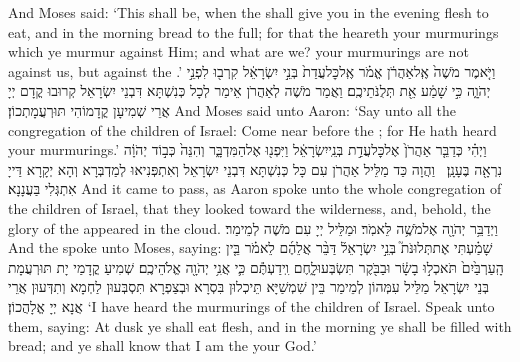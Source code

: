 {And Moses said: ‘This shall be, when the \lord\space shall give you in the evening flesh to eat, and in the morning bread to the full; for that the \lord\space heareth your murmurings which ye murmur against Him; and what are we? your murmurings are not against us, but against the \lord.’}{}
{וַיֹּ֤אמֶר מֹשֶׁה֙ אֶֽל\maqqaf אַהֲרֹ֔ן אֱמֹ֗ר אֶֽל\maqqaf כׇּל\maqqaf עֲדַת֙ בְּנֵ֣י יִשְׂרָאֵ֔ל קִרְב֖וּ לִפְנֵ֣י יְהֹוָ֑ה כִּ֣י שָׁמַ֔ע אֵ֖ת תְּלֻנֹּתֵיכֶֽם׃}
{וַאֲמַר מֹשֶׁה לְאַהֲרֹן אֵימַר לְכָל כְּנִשְׁתָּא דִּבְנֵי יִשְׂרָאֵל קְרוּבוּ קֳדָם יְיָ אֲרֵי שְׁמִיעָן קֳדָמוֹהִי תּוּרְעֲמָתְכוֹן׃}
{And Moses said unto Aaron: ‘Say unto all the congregation of the children of Israel: Come near before the \lord; for He hath heard your murmurings.’}{}
{וַיְהִ֗י כְּדַבֵּ֤ר אַהֲרֹן֙ אֶל\maqqaf כׇּל\maqqaf עֲדַ֣ת בְּנֵֽי\maqqaf יִשְׂרָאֵ֔ל וַיִּפְנ֖וּ אֶל\maqqaf הַמִּדְבָּ֑ר וְהִנֵּה֙ כְּב֣וֹד יְהֹוָ֔ה נִרְאָ֖ה בֶּעָנָֽן׃ \petucha }
{וַהֲוָה כַּד מַלֵּיל אַהֲרֹן עִם כָּל כְּנִשְׁתָּא דִּבְנֵי יִשְׂרָאֵל וְאִתְפְּנִיאוּ לְמַדְבְּרָא וְהָא יְקָרָא דַּייָ אִתְגְּלִי בַּעֲנָנָא׃}
{And it came to pass, as Aaron spoke unto the whole congregation of the children of Israel, that they looked toward the wilderness, and, behold, the glory of the \lord\space appeared in the cloud.}{}
{וַיְדַבֵּ֥ר יְהֹוָ֖ה אֶל\maqqaf מֹשֶׁ֥ה לֵּאמֹֽר׃}
{וּמַלֵּיל יְיָ עִם מֹשֶׁה לְמֵימַר׃}
{And the \lord\space spoke unto Moses, saying:}{}
{שָׁמַ֗עְתִּי אֶת\maqqaf תְּלוּנֹּת֮ בְּנֵ֣י יִשְׂרָאֵל֒ דַּבֵּ֨ר אֲלֵהֶ֜ם לֵאמֹ֗ר בֵּ֤ין הָֽעַרְבַּ֙יִם֙ תֹּאכְל֣וּ בָשָׂ֔ר וּבַבֹּ֖קֶר תִּשְׂבְּעוּ\maqqaf לָ֑חֶם וִֽידַעְתֶּ֕ם כִּ֛י אֲנִ֥י יְהֹוָ֖ה אֱלֹהֵיכֶֽם׃}
{שְׁמִיעַ קֳדָמַי יָת תּוּרְעֲמָת בְּנֵי יִשְׂרָאֵל מַלֵּיל עִמְּהוֹן לְמֵימַר בֵּין שִׁמְשַׁיָּא תֵּיכְלוּן בִּסְרָא וּבְצַפְרָא תִּסְבְּעוּן לַחְמָא וְתִדְּעוּן אֲרֵי אֲנָא יְיָ אֱלָהֲכוֹן׃}
{‘I have heard the murmurings of the children of Israel. Speak unto them, saying: At dusk ye shall eat flesh, and in the morning ye shall be filled with bread; and ye shall know that I am the \lord\space your God.’}{}
